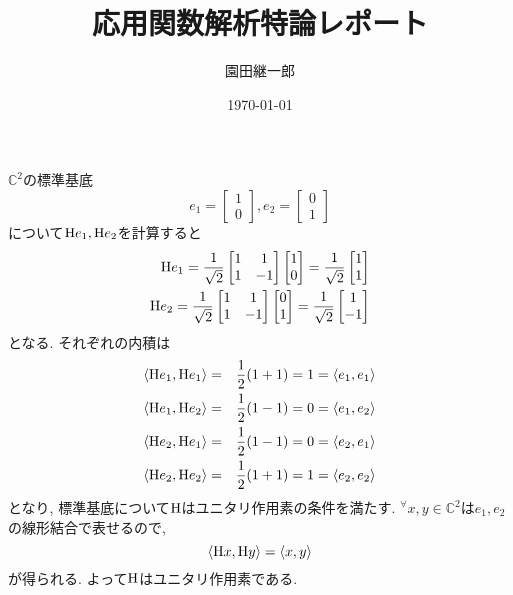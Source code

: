 \documentclass[a4paper,11pt]{jsarticle}
\begin{document}
\title{応用関数解析特論レポート}
\author{園田継一郎}
\date{\today}
\maketitle

\section{}
$\mathbb{C}^2$の標準基底
\[
  e_1 = \begin{bmatrix}
    1 \\ 0
  \end{bmatrix}, 
  e_2 = \begin{bmatrix}
    0 \\ 1
  \end{bmatrix}
\]
について${\rm H}e_1, {\rm H}e_2$を計算すると
\begin{eqnarray*}
  {\rm H}e_1 = \frac{1}{\sqrt{2}} \begin{bmatrix}
    1 & 1 \\ 1 & -1
  \end{bmatrix} \begin{bmatrix}
    1 \\ 0
  \end{bmatrix} = \frac{1}{\sqrt{2}} \begin{bmatrix}
    1 \\ 1
  \end{bmatrix} \\
  {\rm H}e_2 = \frac{1}{\sqrt{2}} \begin{bmatrix}
    1 & 1 \\ 1 & -1
  \end{bmatrix} \begin{bmatrix}
    0 \\ 1
  \end{bmatrix} = \frac{1}{\sqrt{2}} \begin{bmatrix}
    1 \\ -1
  \end{bmatrix}
\end{eqnarray*}
となる. それぞれの内積は
\begin{eqnarray*}
  \braket{{\rm H}e_1, {\rm H}e_1}
  &=& \frac{1}{2}(1 + 1) = 1 = \braket{e_1, e_1} \\
  \braket{{\rm H}e_1, {\rm H}e_2}
  &=& \frac{1}{2}(1 - 1) = 0 = \braket{e_1, e_2} \\
  \braket{{\rm H}e_2, {\rm H}e_1}
  &=& \frac{1}{2}(1 - 1) = 0 = \braket{e_2, e_1} \\
  \braket{{\rm H}e_2, {\rm H}e_2}
  &=& \frac{1}{2}(1 + 1) = 1 = \braket{e_2, e_2} \\
\end{eqnarray*}
となり, 標準基底について${\rm H}$はユニタリ作用素の条件を満たす.
${}^\forall x, y \in \mathbb{C}^2$は$e_1, e_2$
の線形結合で表せるので, 
\[
  \braket{{\rm H}x, {\rm H}y} = \braket{x, y}
\]
が得られる. よって${\rm H}$はユニタリ作用素である.
\end{document}
